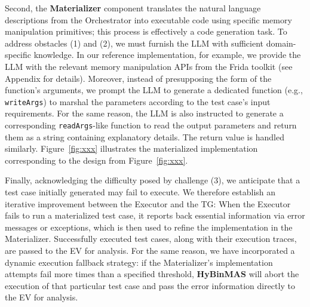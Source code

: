 \documentclass[acmsmall,screen,review,anonymous]{acmart} %
\begin{document}
Second, the \textbf{Materializer} component translates the natural language descriptions from the Orchestrator into executable code using specific memory manipulation primitives; this process is effectively a code generation task. To address obstacles (1) and (2), we must furnish the LLM with sufficient domain-specific knowledge. In our reference implementation, for example, we provide the LLM with the relevant memory manipulation APIs from the Frida toolkit (see Appendix for details). Moreover, instead of presupposing the form of the function's arguments, we prompt the LLM to generate a dedicated function (e.g., \texttt{writeArgs}) to marshal the parameters according to the test case's input requirements. For the same reason, the LLM is also instructed to generate a corresponding \texttt{readArgs}-like function to read the output parameters and return them as a string containing explanatory details. The return value is handled similarly. Figure~\ref{fig:xxx} illustrates the materialized implementation corresponding to the design from Figure~\ref{fig:xxx}.

Finally, acknowledging the difficulty posed by challenge (3), we anticipate that a test case initially generated may fail to execute. We therefore establish an iterative improvement between the Executor and the TG: When the Executor fails to run a materialized test case, it reports back essential information via error messages or exceptions, which is then used to refine the implementation in the Materializer. Successfully executed test cases, along with their execution traces, are passed to the EV for analysis. For the same reason, we have incorporated a dynamic execution fallback strategy: if the Materializer's implementation attempts fail more times than a specified threshold, \textbf{HyBinMAS} will abort the execution of that particular test case and pass the error information directly to the EV for analysis.

\end{document}
